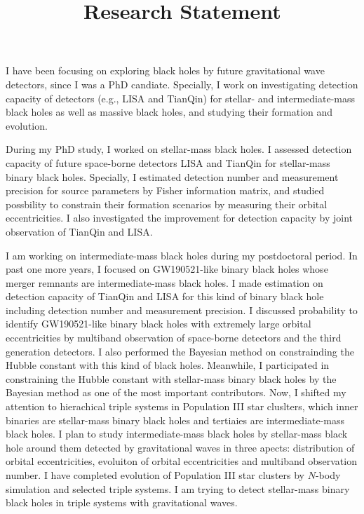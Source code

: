 \documentclass[12pt,a4paper,sans]{article}%
\title{\vspace{-2.5cm}\Huge Research Statement \vspace{-2.2em}}
\date{}
\begin{document}
\maketitle

I have been focusing on exploring black holes by future gravitational wave detectors, since I was a PhD candiate.
Specially, I work on investigating detection capacity of detectors (e.g., LISA and TianQin) for stellar- and
intermediate-mass black holes as well as massive black holes, and studying their formation and evolution.

During my PhD study, I worked on stellar-mass black holes. I assessed detection capacity of future space-borne detectors
LISA and TianQin for stellar-mass binary black holes. Specially, I estimated detection number and measurement precision for
source parameters by Fisher information matrix, and studied possbility to constrain their formation scenarios by
measuring their orbital eccentricities. I also investigated the improvement for detection capacity by joint
observation of TianQin and LISA.

I am working on intermediate-mass black holes during my postdoctoral period. In past one more years, I focused on
GW190521-like binary black holes whose merger remnants are intermediate-mass black holes. I made estimation on detection
capacity of TianQin and LISA for this kind of binary black hole including detection number and measurement precision. I
discussed probability to identify GW190521-like binary black holes with extremely large orbital eccentricities by
multiband observation of space-borne detectors and the third generation detectors. I also performed the Bayesian method
on constrainding the Hubble constant with this kind of black holes. Meanwhile, I participated in constraining the Hubble
constant with stellar-mass binary black holes by the Bayesian method as one of the most important contributors. Now, I
shifted my attention to hierachical triple systems in Population III star cluslters, which inner binaries are
stellar-mass binary black holes and tertiaies are intermediate-mass black holes. I plan to study intermediate-mass black
holes by stellar-mass black hole around them detected by gravitational waves in three apects: distribution of orbital
eccentricities, evoluiton of orbital eccentricities and multiband observation number. I have completed evolution of
Population III star clusters by $N$-body simulation and selected triple systems. I am trying to detect stellar-mass
binary black holes in triple systems with gravitational waves.
\end{document}
